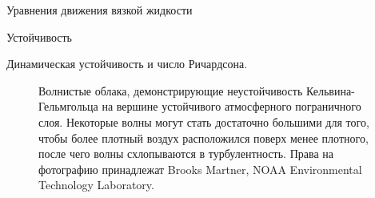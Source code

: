 \begin{chapter}{Уравнения движения вязкой жидкости}
\begin{section}{Устойчивость}
\begin{paragraph}{Динамическая устойчивость и число Ричардсона.}
\begin{figure}[t!]
\caption{Волнистые облака, демонстрирующие неустойчивость
Кельвина-Гельмгольца на вершине устойчивого атмосферного пограничного
слоя. Некоторые волны могут стать достаточно большими для того, чтобы
более плотный воздух расположился поверх менее плотного, после чего волны 
схлопываются в турбулентность. 
Права на фотографию принадлежат Brooks Martner, NOAA Environmental 
Technology Laboratory.}
\label{fig:helmholtz}
\end{figure}
%


\end{paragraph}
\end{section}
\end{chapter}
